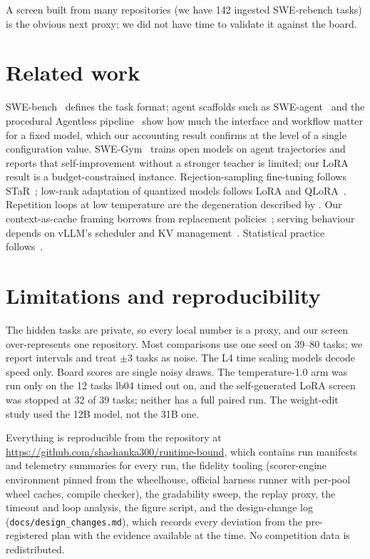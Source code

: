 \documentclass[11pt]{article}
\begin{document}
A screen built from many repositories (we have 142 ingested SWE-rebench tasks) is the obvious next proxy; we did not have time to validate it against the board.

\FloatBarrier
\section{Related work}
SWE-bench~\citep{jimenez2024swebench} defines the task format; agent scaffolds such as SWE-agent~\citep{yang2024sweagent} and the procedural Agentless pipeline~\citep{xia2024agentless} show how much the interface and workflow matter for a fixed model, which our accounting result confirms at the level of a single configuration value. SWE-Gym~\citep{pan2025swegym} trains open models on agent trajectories and reports that self-improvement without a stronger teacher is limited; our LoRA result is a budget-constrained instance. Rejection-sampling fine-tuning follows STaR~\citep{zelikman2022star}; low-rank adaptation of quantized models follows LoRA and QLoRA~\citep{hu2022lora,dettmers2023qlora}. Repetition loops at low temperature are the degeneration described by \citet{holtzman2020degeneration}. Our context-as-cache framing borrows from replacement policies~\citep{belady1966}; serving behaviour depends on vLLM's scheduler and KV management~\citep{kwon2023vllm}. Statistical practice follows~\citet{agarwal2021rliable}.

\section{Limitations and reproducibility}
\label{sec:limits}
The hidden tasks are private, so every local number is a proxy, and our screen over-represents one repository. Most comparisons use one seed on 39--80 tasks; we report intervals and treat $\pm$3 tasks as noise. The L4 time scaling models decode speed only. Board scores are single noisy draws. The temperature-1.0 arm was run only on the 12 tasks lb04 timed out on, and the self-generated LoRA screen was stopped at 32 of 39 tasks; neither has a full paired run. The weight-edit study used the 12B model, not the 31B one.

Everything is reproducible from the repository at \url{https://github.com/shashanka300/runtime-bound}, which contains run manifests and telemetry summaries for every run, the fidelity tooling (scorer-engine environment pinned from the wheelhouse, official harness runner with per-pool wheel caches, compile checker), the gradability sweep, the replay proxy, the timeout and loop analysis, the figure script, and the design-change log (\nolinkurl{docs/design_changes.md}), which records every deviation from the pre-registered plan with the evidence available at the time. No competition data is redistributed.



\end{document}
